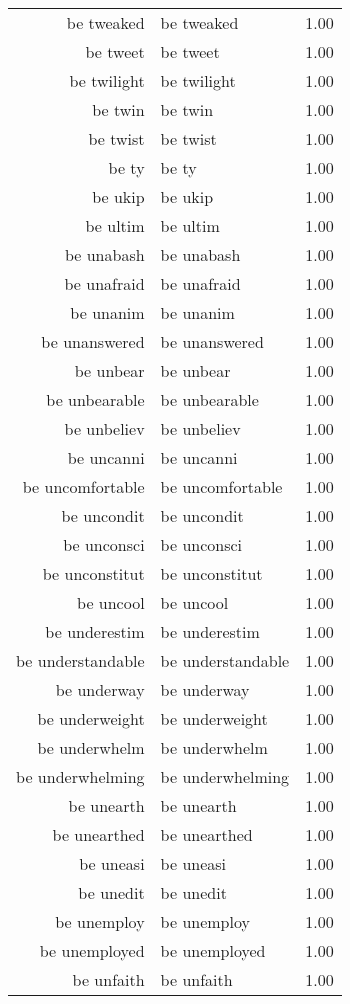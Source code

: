 \begin{table}[ht]
\begin{tabular}{rlr}
  be tweaked & be tweaked & 1.00 \\ 
  be tweet & be tweet & 1.00 \\ 
  be twilight & be twilight & 1.00 \\ 
  be twin & be twin & 1.00 \\ 
  be twist & be twist & 1.00 \\ 
  be ty & be ty & 1.00 \\ 
  be ukip & be ukip & 1.00 \\ 
  be ultim & be ultim & 1.00 \\ 
  be unabash & be unabash & 1.00 \\ 
  be unafraid & be unafraid & 1.00 \\ 
  be unanim & be unanim & 1.00 \\ 
  be unanswered & be unanswered & 1.00 \\ 
  be unbear & be unbear & 1.00 \\ 
  be unbearable & be unbearable & 1.00 \\ 
  be unbeliev & be unbeliev & 1.00 \\ 
  be uncanni & be uncanni & 1.00 \\ 
  be uncomfortable & be uncomfortable & 1.00 \\ 
  be uncondit & be uncondit & 1.00 \\ 
  be unconsci & be unconsci & 1.00 \\ 
  be unconstitut & be unconstitut & 1.00 \\ 
  be uncool & be uncool & 1.00 \\ 
  be underestim & be underestim & 1.00 \\ 
  be understandable & be understandable & 1.00 \\ 
  be underway & be underway & 1.00 \\ 
  be underweight & be underweight & 1.00 \\ 
  be underwhelm & be underwhelm & 1.00 \\ 
  be underwhelming & be underwhelming & 1.00 \\ 
  be unearth & be unearth & 1.00 \\ 
  be unearthed & be unearthed & 1.00 \\ 
  be uneasi & be uneasi & 1.00 \\ 
  be unedit & be unedit & 1.00 \\ 
  be unemploy & be unemploy & 1.00 \\ 
  be unemployed & be unemployed & 1.00 \\ 
  be unfaith & be unfaith & 1.00 \\ 

\end{tabular}
\end{table}
